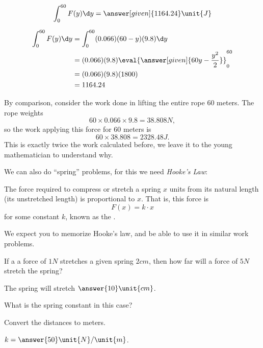 \documentclass{ximera}
\begin{document}
\begin{example}
\begin{explanation}
    \[
    \int_0^{60} F(y) \d y = \answer[given]{1164.24} \unit{J}
    \]
    \begin{hint}
      \begin{align*}
	\int_0^{60} F(y) \d y &= \int_0^{60}(0.066)(60-y)(9.8) \d y \\
	&= (0.066)(9.8) \eval{\answer[given]{60y - \frac{y^2}{2}}}_0^{60}\\
	&=(0.066)(9.8)(1800)\\
	&= 1164.24
      \end{align*}
    \end{hint}    
    By comparison, consider the work done in lifting the entire rope
    $60$ meters. The rope weights
    \[
    60\times 0.066 \times 9.8 = 38.808\unit{N},
    \]
    so the work applying this force for $60$ meters is
    \[
    60\times 38.808 = 2328.48 \unit{J}.
    \]
    This is exactly twice the work calculated before, we leave it to
    the young mathematician to understand why.
  \end{explanation}
\end{example}

We can also do ``spring'' problems, for this we need \textit{Hooke's
  Law}:

\begin{definition}
  The force required to compress or stretch a spring $x$ units from
  its natural length (its unstretched length) is proportional to $x$.
  That is, this force is
  \[
  F(x) = k\cdot x
  \]
  for some constant $k$, known as the .
\end{definition}

\begin{warning}
  We expect you to memorize Hooke's law, and be able to use it in similar work problems.
\end{warning}

\begin{question}
  If a a force of $1\unit{N}$ stretches a given spring $2\unit{cm}$,
  then how far will a force of $5\unit{N}$ stretch the spring?
  \begin{prompt}
    The spring will stretch $\answer{10}\unit{cm}$.
  \end{prompt}
  \begin{question}
    What is the spring constant in this case?
    \begin{hint}
      Convert the distances to meters.
    \end{hint}
    \begin{prompt}
      $k= \answer{50}\unit{N}/\unit{m}$.
    \end{prompt}
  \end{question}
\end{question}
  
\end{document}
